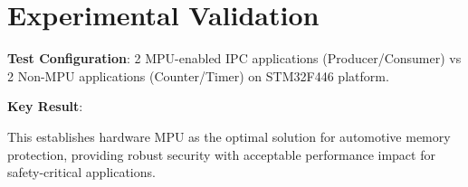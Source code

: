 \section{Experimental Validation}

\textbf{Test Configuration}: 2 MPU-enabled IPC applications (Producer/Consumer) vs 2 Non-MPU applications (Counter/Timer) on STM32F446 platform.

\textbf{Key Result}: 

This establishes hardware MPU as the optimal solution for automotive memory protection, providing robust security with acceptable performance impact for safety-critical applications.
